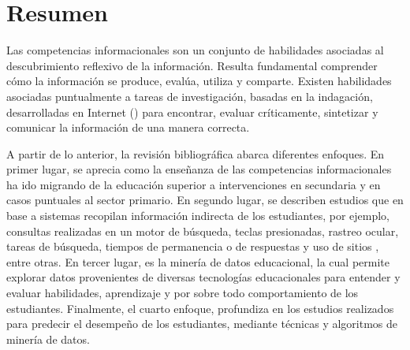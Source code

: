 \section{Resumen}
\label{sec:marco_estado_arte_resumen}
Las competencias informacionales son un conjunto de habilidades asociadas al descubrimiento  reflexivo de la información. Resulta fundamental comprender cómo la información se produce, evalúa, utiliza y comparte. Existen habilidades asociadas puntualmente a tareas de investigación, basadas en la indagación, desarrolladas en Internet () para encontrar, evaluar críticamente, sintetizar y comunicar la información de una manera correcta.  

A partir de lo anterior, la revisión bibliográfica abarca diferentes enfoques. En primer lugar, se aprecia como la enseñanza de las competencias informacionales ha ido migrando de la educación superior a intervenciones en secundaria y en casos puntuales al sector primario. En segundo lugar, se describen estudios que en base a sistemas recopilan información indirecta de los estudiantes, por ejemplo, consultas realizadas en un motor de búsqueda, teclas presionadas, rastreo ocular, tareas de búsqueda, tiempos de permanencia o de respuestas y uso de sitios , entre otras. En tercer lugar, es la minería de datos educacional, la cual permite explorar datos provenientes de diversas tecnologías educacionales para entender y evaluar habilidades, aprendizaje y por sobre todo comportamiento de los estudiantes. Finalmente, el cuarto enfoque, profundiza en los estudios realizados para predecir el desempeño de los estudiantes, mediante técnicas y algoritmos de minería de datos.   


